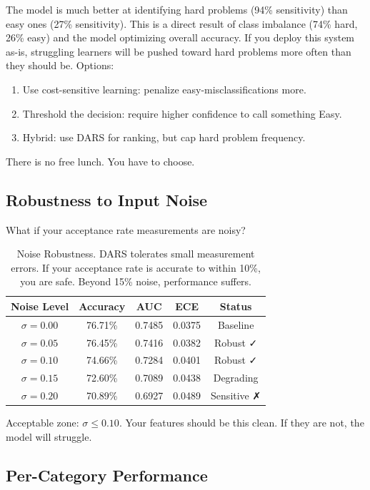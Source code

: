 \documentclass[conference]{IEEEtran}
\begin{document}
The model is much better at identifying hard problems (94\% sensitivity) than easy ones (27\% sensitivity). This is a direct result of class imbalance (74\% hard, 26\% easy) and the model optimizing overall accuracy. If you deploy this system as-is, struggling learners will be pushed toward hard problems more often than they should be. Options:
\begin{enumerate}
    \item Use cost-sensitive learning: penalize easy-misclassifications more.
    \item Threshold the decision: require higher confidence to call something Easy.
    \item Hybrid: use DARS for ranking, but cap hard problem frequency.
\end{enumerate}

There is no free lunch. You have to choose.

\subsection{Robustness to Input Noise}

What if your acceptance rate measurements are noisy?

\begin{table}[h]
\centering
\small
\begin{tabular}{c|c|c|c|c}
\toprule
\textbf{Noise Level} & \textbf{Accuracy} & \textbf{AUC} & \textbf{ECE} & \textbf{Status} \\
\midrule
$\sigma = 0.00$ & 76.71\% & 0.7485 & 0.0375 & Baseline \\
$\sigma = 0.05$ & 76.45\% & 0.7416 & 0.0382 & Robust ✓ \\
$\sigma = 0.10$ & 74.66\% & 0.7284 & 0.0401 & Robust ✓ \\
$\sigma = 0.15$ & 72.60\% & 0.7089 & 0.0438 & Degrading \\
$\sigma = 0.20$ & 70.89\% & 0.6927 & 0.0489 & Sensitive ✗ \\
\bottomrule
\end{tabular}
\caption{Noise Robustness. DARS tolerates small measurement errors. If your acceptance rate is accurate to within 10\%, you are safe. Beyond 15\% noise, performance suffers.}
\label{tab:noise}
\end{table}

Acceptable zone: $\sigma \leq 0.10$. Your features should be this clean. If they are not, the model will struggle.

\subsection{Per-Category Performance}
\end{document}
